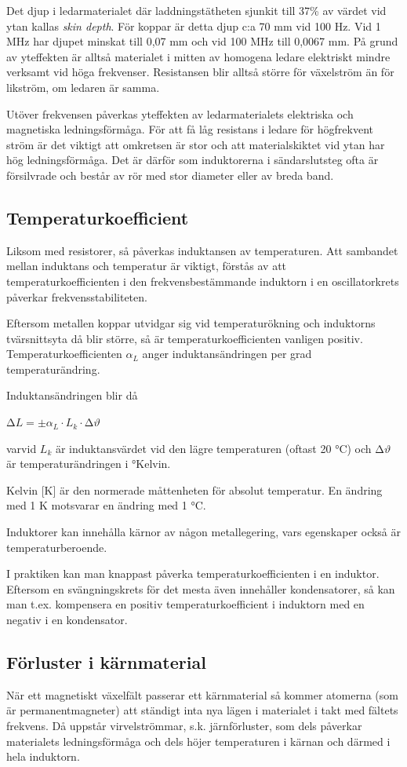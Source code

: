 Det djup i ledarmaterialet där laddningstätheten sjunkit till 37\% av
värdet vid ytan kallas \emph{skin depth}. För koppar är detta djup c:a 70 mm vid
100 Hz. Vid 1 MHz har djupet minskat till 0,07 mm och vid 100 MHz till
0,0067 mm. På grund av yteffekten är alltså materialet i mitten av homogena
ledare elektriskt mindre verksamt vid höga frekvenser. Resistansen blir alltså
större för växelström än för likström, om ledaren är samma.

Utöver frekvensen påverkas yteffekten av ledarmaterialets elektriska och
magnetiska ledningsförmåga. För att få låg resistans i ledare för högfrekvent
ström är det viktigt att omkretsen är stor och att materialskiktet vid ytan har
hög ledningsförmåga. Det är därför som induktorerna i sändarslutsteg ofta är
försilvrade och består av rör med stor diameter eller av breda band.

\subsection{Temperaturkoefficient}

Liksom med resistorer, så påverkas induktansen av temperaturen. Att sambandet
mellan induktans och temperatur är viktigt, förstås av att
temperaturkoefficienten i den frekvensbestämmande induktorn i en oscillatorkrets
påverkar frekvensstabiliteten.

Eftersom metallen koppar utvidgar sig vid temperaturökning och induktorns
tvärsnittsyta då blir större, så är temperaturkoefficienten vanligen positiv.
Temperaturkoefficienten \(\alpha_L\) anger induktansändringen per grad temperaturändring.

Induktansändringen blir då

\(∆L = \pm \alpha _L \cdot L_k \cdot ∆\vartheta\)

varvid \(L_k\) är induktansvärdet vid den lägre temperaturen (oftast 20 °C) och
\(∆\vartheta\) är temperaturändringen i °Kelvin.

Kelvin [K] är den normerade måttenheten för absolut temperatur. En ändring med
1 K motsvarar en ändring med 1 °C.

Induktorer kan innehålla kärnor av någon metallegering, vars egenskaper också är
temperaturberoende.

I praktiken kan man knappast påverka temperaturkoefficienten i en induktor.
Eftersom en svängningskrets för det mesta även innehåller kondensatorer, så kan
man t.ex. kompensera en positiv temperaturkoefficient i induktorn med en negativ
i en kondensator.

\subsection{Förluster i kärnmaterial}

När ett magnetiskt växelfält passerar ett kärnmaterial så kommer atomerna (som
är permanentmagneter) att ständigt inta nya lägen i materialet i takt med
fältets frekvens. Då uppstår virvelströmmar, s.k. järnförluster, som dels
påverkar materialets ledningsförmåga och dels höjer temperaturen i kärnan och
därmed i hela induktorn.
